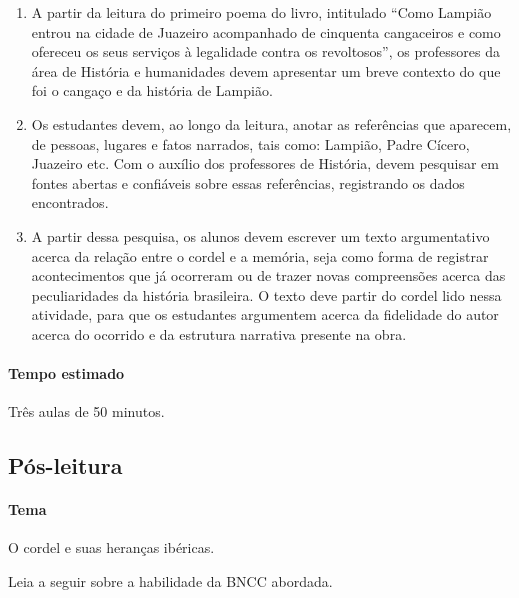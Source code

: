 \documentclass[12pt]{extarticle}
\begin{document}
\begin{enumerate}

\item A partir da leitura do primeiro poema do livro, intitulado ``Como Lampião entrou na cidade de
Juazeiro acompanhado de cinquenta cangaceiros e como ofereceu os seus serviços à legalidade contra os revoltosos'',
os professores da área de História e humanidades devem apresentar um breve contexto do que foi o cangaço e da história de Lampião.

\item Os estudantes devem, ao longo da leitura, anotar as referências que aparecem, de pessoas, lugares e fatos narrados, tais como: Lampião, Padre Cícero, Juazeiro etc. Com o auxílio dos professores de História, devem pesquisar em fontes abertas e confiáveis sobre essas referências, registrando os dados encontrados.

\item A partir dessa pesquisa, os alunos devem escrever um texto argumentativo acerca da relação entre o cordel e a memória, seja como forma de registrar acontecimentos que já ocorreram ou de trazer novas compreensões acerca das peculiaridades da história brasileira. O texto deve partir do cordel lido nessa atividade, para que os estudantes argumentem acerca da fidelidade do autor acerca do ocorrido e da estrutura narrativa presente na obra.

\end{enumerate}

\paragraph{Tempo estimado} Três aulas de 50 minutos.


\begin{comment}


\end{comment}

\subsection{Pós-leitura}

\paragraph{Tema} O cordel e suas heranças ibéricas.

  Leia a seguir sobre a habilidade da BNCC abordada. 
\end{document}

